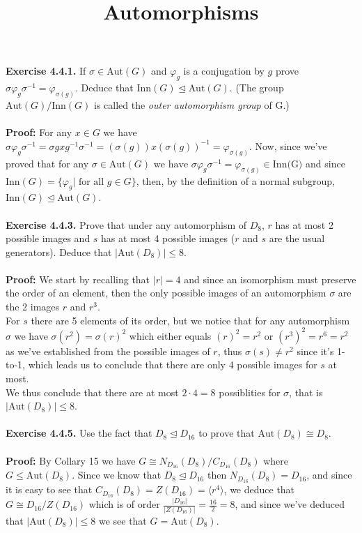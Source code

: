 \documentclass{article}
\title{\textbf{Automorphisms}}
\begin{document}
	\maketitle
	\textbf{Exercise 4.4.1.} If $\sigma \in \text{Aut}(G)$ and $\varphi_g$ is a conjugation by $g$ prove $\sigma \varphi_g \sigma^{-1} = \varphi_{\sigma(g)}$. Deduce that $\text{Inn}(G) \trianglelefteq \text{Aut}(G)$. (The group $\text{Aut}(G)/\text{Inn}(G)$ is called the \textit{outer automorphism group} of G.) \\ \\
	\textbf{Proof:} For any $x \in G$ we have $\sigma \varphi_g \sigma^{-1} = \sigma gxg^{-1} \sigma^{-1} = (\sigma(g)) x (\sigma(g))^{-1} = \varphi_{\sigma(g)}$. Now, since we've proved that for any $\sigma \in \text{Aut}(G) \text{ we have } \sigma \varphi_g \sigma^{-1} = \varphi_{\sigma(g)} \in \text{Inn(G)}$ and since $\text{Inn}(G) = \{\varphi_g | \text{ for all } g \in G\}$, then, by the definition of a normal subgroup, $\text{Inn}(G) \trianglelefteq \text{Aut}(G)$. \\ \\ 
	\textbf{Exercise 4.4.3.} Prove that under any automorphism of $D_8$, $r$ has at most 2 possible images and $s$ has at most 4 possible images ($r$ and $s$ are the usual generators). Deduce that $|\text{Aut}(D_8)| \leq 8$. \\ \\
	\textbf{Proof:} We start by recalling that $|r| = 4$ and since an isomorphism must preserve the order of an element, then the only possible images of an automorphism $\sigma$ are the 2 images $r$ and $r^3$. \\
	For $s$ there are 5 elements of its order, but we notice that for any automorphism $\sigma$ we have $\sigma(r^2) = \sigma(r)^2$ which either equals $(r)^2 = r^2$ or $(r^3)^2 = r^6 = r^2$ as we've established from the possible images of $r$, thus $\sigma(s) \neq r^2$ since it's 1-to-1, which leads us to conclude that there are only 4 possible images for $s$ at most. \\ 
	We thus conclude that there are at most $2 \cdot 4 = 8$ possiblities for $\sigma$, that is $|\text{Aut}(D_8)| \leq 8$.\\ \\ 
	\textbf{Exercise 4.4.5.} Use the fact that $D_8 \trianglelefteq D_{16}$ to prove that $\text{Aut}(D_8) \cong D_8$. \\ \\
	\textbf{Proof:} By Collary 15 we have $G \cong N_{D_{16}}(D_8)/C_{D_{16}}(D_8)$ where $G \leq \text{Aut}(D_8)$. Since we know that $D_8 \trianglelefteq D_{16}$ then $N_{D_{16}}(D_8) = D_{16}$, and since it is easy to see that $C_{D_{16}}(D_8) = Z(D_{16}) = \langle r^4 \rangle$, we deduce that $G \cong D_{16}/Z(D_{16})$ which is of order $\frac{|D_{16}|}{|Z(D_{16})|} = \frac{16}{2} = 8$, and since we've deduced that $|\text{Aut}(D_8)| \leq 8$ we see that $G = \text{Aut}(D_8)$. \\
\end{document}
